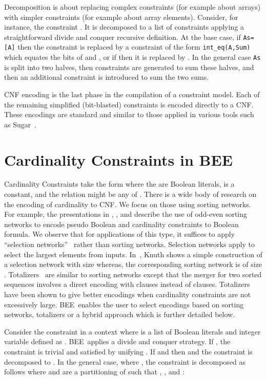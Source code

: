 \documentclass[runningheads,a4paper]{llncs}
\newcommand{\bee}{\textsf{BEE}}
\begin{document}
Decomposition is about replacing complex constraints (for example
about arrays) with simpler constraints (for example about array
elements). Consider, for instance, the constraint
. It is decomposed to a list of
 constraints applying a straightforward divide and
conquer recursive definition. At the base case, if \texttt{As=[A]}
then the constraint is replaced by a constraint of the form
\texttt{int\_eq(A,Sum)} which equates the bits of  and
, or if  then it is replaced by
.
In the general case \texttt{As} is split into two halves, then
constraints are generated to sum these halves, and then an additional
 constraint is introduced to sum the two sums.

CNF encoding is the last phase in the compilation of a constraint
model. Each of the remaining simplified (bit-blasted) constraints is
encoded directly to a CNF. These encodings are standard and similar to
those applied in various tools such as Sugar~\cite{sugar2009}.




\section{Cardinality Constraints in \bee}

Cardinality Constraints take the form 
where the  are Boolean literals,  is a constant, and the
relation  might be any of .  There is a
wide body of research on the encoding of cardinality to CNF. We focus
on those using sorting networks. For example, the presentations in
\cite{EenS06}, \cite{CodishFFS11}, and \cite{AsinNOR09,AsinNOR11}
describe the use of odd-even sorting networks to encode pseudo Boolean
and cardinality constraints to Boolean formula.
We observe that for applications of this type, it suffices to apply
``selection networks''~\cite{Knuth73} rather than sorting
networks. Selection networks apply to select the  largest
elements from  inputs.  In~\cite{Knuth73}, Knuth shows a simple
construction of a selection network with  size whereas,
the corresponding sorting network is of size .
Totalizers~\cite{BailleuxB03} are similar to sorting networks except
that the merger for two sorted sequences  involves a direct
encoding with  clauses instead of   clauses. Totalizers have been shown to give better encodings when
cardinality constraints are not excessively large.
\bee\  enables the user to select encodings based on sorting networks,
totalizers or a hybrid approach which is further detailed below.


Consider the constraint  in a
context where  is a list of  Boolean literals and
integer variable  defined as
. \bee\ applies a divide and conquer
strategy. If , the constraint is trivial and satisfied by
unifying . If  and  then
 and the constraint is decomposed to
. In the general case, where
, the constraint is decomposed as follows where 
and  are a partitioning of  such that
, , and
:
 
\end{document}
